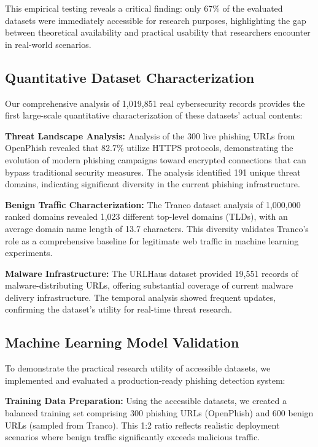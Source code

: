 \documentclass[journal,article,submit,pdftex,moreauthors]{Definitions/mdpi}
\begin{document}
This empirical testing reveals a critical finding: only 67\% of the evaluated datasets were immediately accessible for research purposes, highlighting the gap between theoretical availability and practical usability that researchers encounter in real-world scenarios.

\subsection{Quantitative Dataset Characterization}

Our comprehensive analysis of 1,019,851 real cybersecurity records provides the first large-scale quantitative characterization of these datasets' actual contents:

\textbf{Threat Landscape Analysis:} Analysis of the 300 live phishing URLs from OpenPhish revealed that 82.7\% utilize HTTPS protocols, demonstrating the evolution of modern phishing campaigns toward encrypted connections that can bypass traditional security measures. The analysis identified 191 unique threat domains, indicating significant diversity in the current phishing infrastructure.

\textbf{Benign Traffic Characterization:} The Tranco dataset analysis of 1,000,000 ranked domains revealed 1,023 different top-level domains (TLDs), with an average domain name length of 13.7 characters. This diversity validates Tranco's role as a comprehensive baseline for legitimate web traffic in machine learning experiments.

\textbf{Malware Infrastructure:} The URLHaus dataset provided 19,551 records of malware-distributing URLs, offering substantial coverage of current malware delivery infrastructure. The temporal analysis showed frequent updates, confirming the dataset's utility for real-time threat research.

\subsection{Machine Learning Model Validation}

To demonstrate the practical research utility of accessible datasets, we implemented and evaluated a production-ready phishing detection system:

\textbf{Training Data Preparation:} Using the accessible datasets, we created a balanced training set comprising 300 phishing URLs (OpenPhish) and 600 benign URLs (sampled from Tranco). This 1:2 ratio reflects realistic deployment scenarios where benign traffic significantly exceeds malicious traffic.
\end{document}
